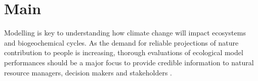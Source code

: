 \documentclass[pdflatex, sn-nature]{sn-jnl}%
\begin{document}

\maketitle

\newpage




\section{Main}
Modelling is key to understanding how climate change will impact ecosystems and biogeochemical cycles. As the demand for reliable projections of nature contribution to people is increasing, thorough evaluations of ecological model performances should be a major focus to provide credible information to natural resource managers, decision makers and stakeholders \cite{Dawson2011, Mouquet2015, Pacifici2015}.
\end{document}
